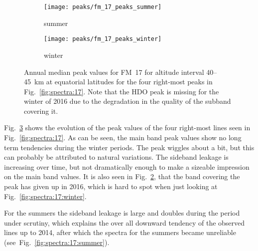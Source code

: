 \begin{figure}[ht]
    \centering
    \begin{subfigure}[b]{0.9545\textwidth}
        \texttt{[image: peaks/fm\_17\_peaks\_summer]}
        \caption{summer}\label{fig:peaks:17:summer}
    \end{subfigure}
    \begin{subfigure}[b]{0.9545\textwidth}
        \texttt{[image: peaks/fm\_17\_peaks\_winter]}
        \caption{winter}\label{fig:peaks:17:winter}
    \end{subfigure}
    \caption{Annual median peak values for FM~17 for altitude interval
        40--45~km at equatorial latitudes for the four right-most peaks in
        Fig.~\ref{fig:spectra:17}. Note that the HDO peak is missing for the
        winter of 2016 due to the degradation in the quality of the subband
        covering it.
        }\label{fig:peaks:17}
\end{figure}

\noindent
Fig.~\ref{fig:peaks:17} shows the evolution of the peak values of the four
right-most lines seen in Fig.~\ref{fig:spectra:17}.  As can be seen, the main
band peak values show no long term tendencies during the winter periods.  The
 peak wiggles about a bit, but this can probably be attributed to
natural variations. The sideband leakage is increasing over time, but not
dramatically enough to make a sizeable impression on the main band values.  It
is also seen in Fig.~\ref{fig:peaks:17:winter}, that the band covering the
 peak has given up in 2016, which is hard to spot when just looking
at Fig.~\ref{fig:spectra:17:winter}.

For the summers the sideband leakage is large and doubles during the period
under scrutiny, which explains the over all downward tendency of the observed
lines up to 2014, after which the spectra for the summers became unreliable
(see~Fig.~\ref{fig:spectra:17:summer}).
